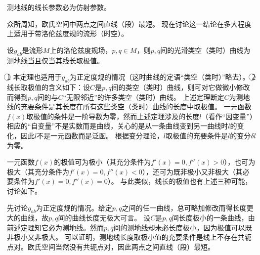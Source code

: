 \begin{theorem}
测地线的线长参数必为仿射参数。
\end{theorem}

众所周知，欧氏空间中两点之间直线（段）最短。
现在讨论这一结论在多大程度上适用于带洛伦兹度规的流形（时空）。

\begin{theorem}
设$g_{ab}$是流形$M$上的洛伦兹度规场，$p, q \in M$，则$p, q$间的光滑类空（类时）曲线为测地线当且仅当其线长取极值。
\end{theorem}

\begin{note}
\textcircled{1} 本定理也适用于$g_{ab}$为正定度规的情况（这时曲线的定语``类空（类时）''略去）。
\textcircled{2} 线长取极值的含义如下：设$C$是$p, q$间的类空（类时）曲线，则可对它做微小修改而得到$p, q$间的与$C$``无限邻近''的许多类空（类时）曲线。
上述定理断定$C$为测地线的充要条件是其长度在所有这些类空（类时）曲线的长度中取极值。
一元函数$f(x)$取极值的条件是一阶导数为零，然而上述定理涉及的长度$l$（看作``因变量''）相应的``自变量''不是实数而是曲线，关心的是从一条曲线变到另一曲线时$l$的变化，因此$l$不是一元函数而是泛函。
根据变分理论，$l$取极值的充要条件是$l$的变分$\delta l$为零。
\end{note}

一元函数$f(x)$的极值可为极小（其充分条件为$f'(x) = 0, f''(x) > 0$），也可为极大（其充分条件为$f'(x) = 0, f''(x) < 0$），还可为既非极小又非极大（其必要条件为$f'(x) = 0, f''(x) = 0$）。
与此类似，线长的极值也有上述三种可能，讨论如下。

先讨论$g_{ab}$为正定度规的情况。给定$p, q$之间的任一曲线，总可略加修改而得长度更大的曲线，故$p, q$间的曲线长度无极大可言。
设$C$是$p, q$间长度极小的一条曲线，由前述定理知它必为测地线。然而$p, q$间的测地线却未必长度极小，因为极值可以既非极小又非极大。
可以证明，测地线长度取极小值的充要条件是线上不存在共轭点对。欧氏空间当然没有共轭点对，因此两点之间直线（段）最短。

